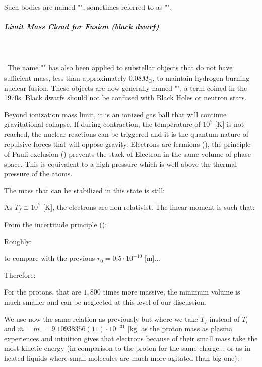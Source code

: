 	Such bodies are named "", sometimes referred to as "".
	
	\pagebreak
	\subparagraph{Limit Mass Cloud for Fusion (black dwarf)}\mbox{}\\\\\
	The name "" has also been applied to substellar objects that do not have sufficient mass, less than approximately $0.08 M_\odot$, to maintain hydrogen-burning nuclear fusion. These objects are now generally named "", a term coined in the 1970s. Black dwarfs should not be confused with Black Holes or neutron stars.
	
	Beyond ionization mass limit, it is an ionized gas ball that will continue gravitational collapse. If during contraction, the temperature of $10^ 7$ [K] is not reached, the nuclear reactions can be triggered and it is the quantum nature of repulsive forces that will oppose gravity. Electrons are fermions (), the principle of Pauli exclusion () prevents the stack of Electron in the same volume of phase space. This is equivalent to a high pressure which is well above the thermal pressure of the atoms.
	
	The mass that can be stabilized in this state is still:
	
	As $T_f\cong 10^7$ [K], the electrons are non-relativist. The linear moment is such that:
	
	From the incertitude principle ():
	
	Roughly:
	
	to compare with the previous $r_0=0.5\cdot 10^{-10}$ [m]...
	
	Therefore:
	
	For the protons, that are $1,800$ times more massive, the minimum volume is much smaller and can be neglected at this level of our discussion.
	
	We use now the same relation as previously but where we take $T_f$ instead of $T_i$ and $\overline{m}=m_e=9.10938356(11)\cdot 10^{-31}$ [kg] as the proton mass as plasma experiences and intuition gives that electrons because of their small mass take the most kinetic energy (in comparison to the proton for the same charge... or as in heated liquids where small molecules are much more agitated than big one):
	
